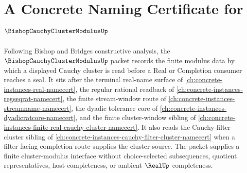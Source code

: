 \chapter{A Concrete Naming Certificate for $\BishopCauchyClusterModulusUp$}
\label{ch:concrete-instances-bishop-cauchy-cluster-modulus-namecert}

Following Bishop and Bridges constructive analysis, the $\BishopCauchyClusterModulusUp$ packet records the finite modulus data by which a displayed Cauchy cluster is read before a Real or Completion consumer reaches a seal. It sits after the terminal real-name surface of \autoref{ch:concrete-instances-real-namecert}, the regular rational readback of \autoref{ch:concrete-instances-regseqrat-namecert}, the finite stream-window route of \autoref{ch:concrete-instances-streamname-namecert}, the dyadic tolerance core of \autoref{ch:concrete-instances-dyadicratcore-namecert}, and the finite cluster-window sibling of \autoref{ch:concrete-instances-finite-real-cauchy-cluster-namecert}. It also reads the Cauchy-filter cluster sibling of \autoref{ch:concrete-instances-cauchy-filter-cluster-namecert} when a filter-facing completion route supplies the cluster source. The packet supplies a finite cluster-modulus interface without choice-selected subsequences, quotient representatives, host completeness, or ambient $\RealUp$ completeness.

